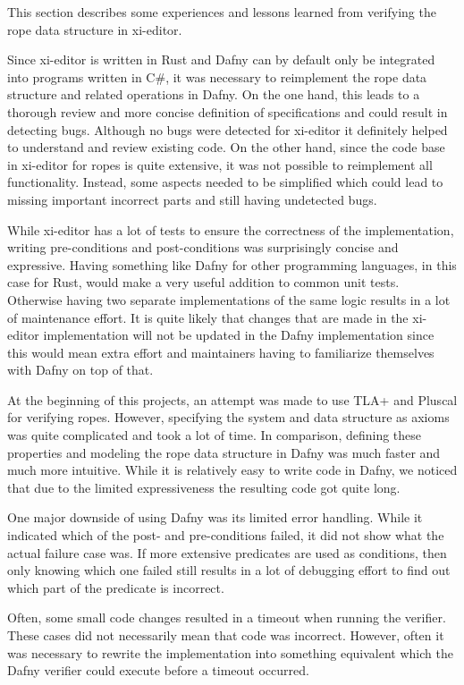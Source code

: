 This section describes some experiences and lessons learned from verifying the rope data structure in xi-editor.

Since xi-editor is written in Rust and Dafny can by default only be integrated into programs written in C\#, it was necessary to reimplement the rope data structure and related operations in Dafny.
On the one hand, this leads to a thorough review and more concise definition of specifications and could result in detecting bugs.
Although no bugs were detected for xi-editor it definitely helped to understand and review existing code.
On the other hand, since the code base in xi-editor for ropes is quite extensive, it was not possible to reimplement all functionality.
Instead, some aspects needed to be simplified which could lead to missing important incorrect parts and still having undetected bugs.

While xi-editor has a lot of tests to ensure the correctness of the implementation, writing pre-conditions and post-conditions was surprisingly concise and expressive.
Having something like Dafny for other programming languages, in this case for Rust, would make a very useful addition to common unit tests.
Otherwise having two separate implementations of the same logic results in a lot of maintenance effort.
It is quite likely that changes that are made in the xi-editor implementation will not be updated in the Dafny implementation since this would mean extra effort and maintainers having to familiarize themselves with Dafny on top of that.

At the beginning of this projects, an attempt was made to use TLA+ and Pluscal for verifying ropes.
However, specifying the system and data structure as axioms was quite complicated and took a lot of time.
In comparison, defining these properties and modeling the rope data structure in Dafny was much faster and much more intuitive.
While it is relatively easy to write code in Dafny, we noticed that due to the limited expressiveness the resulting code got quite long.

One major downside of using Dafny was its limited error handling.
While it indicated which of the post- and pre-conditions failed, it did not show what the actual failure case was.
If more extensive predicates are used as conditions, then only knowing which one failed still results in a lot of debugging effort to find out which part of the predicate is incorrect.

Often, some small code changes resulted in a timeout when running the verifier.
These cases did not necessarily mean that code was incorrect.
However, often it was necessary to rewrite the implementation into something equivalent which the Dafny verifier could execute before a timeout occurred.

